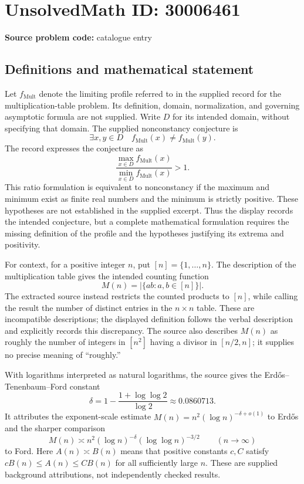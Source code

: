 \documentclass[11pt]{article}
\begin{document}
\section*{UnsolvedMath ID: 30006461}
\textbf{Source problem code:} catalogue entry
\subsection{Definitions and mathematical statement}
Let \(f_{\mathrm{Mult}}\) denote the limiting profile referred to in the supplied record for the multiplication-table problem. Its definition, domain, normalization, and governing asymptotic formula are not supplied. Write \(D\) for its intended domain, without specifying that domain. The supplied nonconstancy conjecture is
\[
\exists x,y\in D\quad f_{\mathrm{Mult}}(x)\ne f_{\mathrm{Mult}}(y).
\]
The record expresses the conjecture as
\[
\frac{\max_{x\in D} f_{\mathrm{Mult}}(x)}{\min_{x\in D} f_{\mathrm{Mult}}(x)}>1.
\]
This ratio formulation is equivalent to nonconstancy if the maximum and minimum exist as finite real numbers and the minimum is strictly positive. These hypotheses are not established in the supplied excerpt. Thus the display records the intended conjecture, but a complete mathematical formulation requires the missing definition of the profile and the hypotheses justifying its extrema and positivity.

For context, for a positive integer \(n\), put \([n]=\{1,\ldots,n\}\). The description of the multiplication table gives the intended counting function
\[
M(n)=\bigl|\{ab:a,b\in[n]\}\bigr|.
\]
The extracted source instead restricts the counted products to \([n]\), while calling the result the number of distinct entries in the \(n\times n\) table. These are incompatible descriptions; the displayed definition follows the verbal description and explicitly records this discrepancy. The source also describes \(M(n)\) as roughly the number of integers in \([n^2]\) having a divisor in \([n/2,n]\); it supplies no precise meaning of ``roughly.''

With logarithms interpreted as natural logarithms, the source gives the Erd\H{o}s--Tenenbaum--Ford constant
\[
\delta=1-\frac{1+\log\log 2}{\log 2}\approx0.0860713.
\]
It attributes the exponent-scale estimate \(M(n)=n^2(\log n)^{-\delta+o(1)}\) to Erd\H{o}s and the sharper comparison
\[
M(n)\asymp n^2(\log n)^{-\delta}(\log\log n)^{-3/2}
\qquad(n\to\infty)
\]
to Ford. Here \(A(n)\asymp B(n)\) means that positive constants \(c,C\) satisfy \(cB(n)\le A(n)\le CB(n)\) for all sufficiently large \(n\). These are supplied background attributions, not independently checked results.
\end{document}
